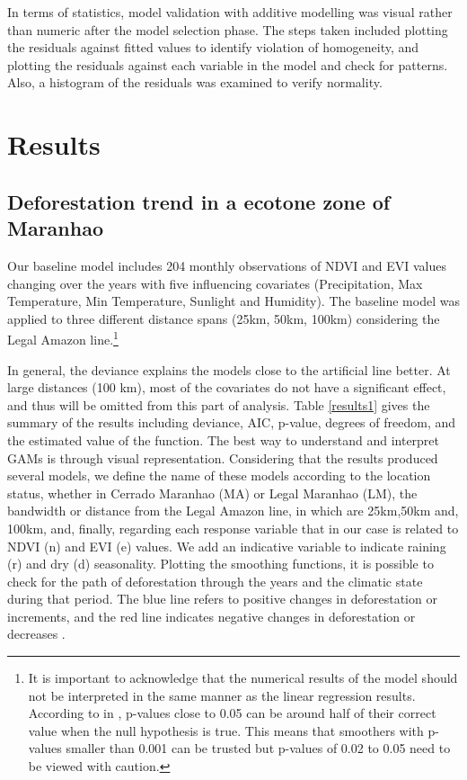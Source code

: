 In terms of statistics, model validation with additive modelling was visual rather than numeric after the model selection phase. The steps taken included plotting the residuals against fitted values to identify violation of homogeneity, and plotting the residuals against each variable in the model and check for patterns. Also, a histogram of the residuals was examined to verify normality. 



\section{Results}  %

\subsection{Deforestation trend in a ecotone zone of Maranhao} \label{resultssection1}


Our baseline model includes 204 monthly observations of NDVI and EVI values changing over the years with five influencing covariates (Precipitation, Max Temperature, Min Temperature, Sunlight and Humidity). The baseline model was applied to three different distance spans (25km, 50km, 100km) considering the Legal Amazon line.\footnote{It is important to acknowledge that the numerical results of the model should not be interpreted in the same manner as the linear regression results. According to \citet{Wood_2011} in \citet{zuur_saveliev_ieno_2014}, p-values close to 0.05 can be around half of their correct value when the null hypothesis is true. This means that smoothers with p-values smaller than 0.001 can be trusted but p-values of 0.02 to 0.05 need to be viewed with caution.} 

In general, the deviance explains the models close to the artificial line better. At large distances (100 km), most of the covariates do not have a significant effect, and thus will be omitted from this part of analysis. Table \ref{results1} gives the summary of the results including deviance, AIC, p-value, degrees of freedom, and the estimated value of the function. The best way to understand and interpret GAMs is through visual representation. Considering that the results produced several models, we define the name of these models according to the location status, whether in Cerrado Maranhao (MA) or Legal Maranhao (LM), the bandwidth or distance from the Legal Amazon line, in which are 25km,50km and, 100km, and, finally, regarding each response variable that in our case is related to NDVI (n) and EVI (e) values. We add an indicative variable to indicate raining (r) and dry (d) seasonality. Plotting the smoothing functions, it is possible to check for the path of deforestation through the years and the climatic state during that period. The blue line refers to positive changes in deforestation or increments, and the red line indicates negative changes in deforestation or decreases \citep{Gavin_2018}. 

